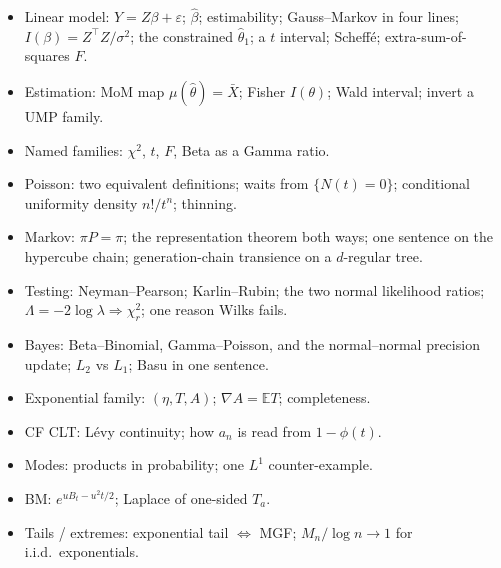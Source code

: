 \begin{itemize}
    \item Linear model: \(Y=Z\beta+\varepsilon\); \(\hat\beta\); estimability; Gauss--Markov in four lines; \(I(\beta)=Z^{\top}Z/\sigma^{2}\); the constrained \(\hat\theta_{1}\); a \(t\) interval; Scheff\'e; extra-sum-of-squares \(F\).
    \item Estimation: MoM map \(\mu(\hat\theta)=\bar X\); Fisher \(I(\theta)\); Wald interval; invert a UMP family.
    \item Named families: \(\chi^{2}\), \(t\), \(F\), Beta as a Gamma ratio.
    \item Poisson: two equivalent definitions; waits from \(\{N(t)=0\}\); conditional uniformity density \(n!/t^{n}\); thinning.
    \item Markov: \(\pi P=\pi\); the representation theorem both ways; one sentence on the hypercube chain; generation-chain transience on a \(d\)-regular tree.
    \item Testing: Neyman--Pearson; Karlin--Rubin; the two normal likelihood ratios; \(\Lambda=-2\log\lambda\Rightarrow\chi^{2}_{r}\); one reason Wilks fails.
    \item Bayes: Beta--Binomial, Gamma--Poisson, and the normal--normal precision update; \(L_{2}\) vs \(L_{1}\); Basu in one sentence.
    \item Exponential family: \((\eta,T,A)\); \(\nabla A=\mathbb{E}T\); completeness.
    \item CF CLT: L\'evy continuity; how \(a_{n}\) is read from \(1-\phi(t)\).
    \item Modes: products in probability; one \(L^{1}\) counter-example.
    \item BM: \(e^{uB_{t}-u^{2}t/2}\); Laplace of one-sided \(T_{a}\).
    \item Tails / extremes: exponential tail \(\Leftrightarrow\) MGF; \(M_{n}/\log n\to 1\) for i.i.d.\ exponentials.
\end{itemize}

